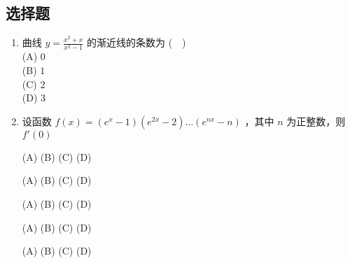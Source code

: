 \subsection{选择题}
\begin{enumerate}
\item 曲线 $\displaystyle y=\frac{x^2+x}{x^2-1}$ 的渐近线的条数为 ($\quad$)\\
(A) $0$\\
(B) $1$\\
(C) $2$\\
(D) $3$
\item 设函数 $f(x)=(e^x-1)(e^{2x}-2)\dots(e^{nx}-n)$ ，其中 $n$ 为正整数，则 $f'(0)$

(A)
(B)
(C)
(D)


(A)
(B)
(C)
(D)


(A)
(B)
(C)
(D)


(A)
(B)
(C)
(D)

(A)
(B)
(C)
(D)
\end{enumerate}
